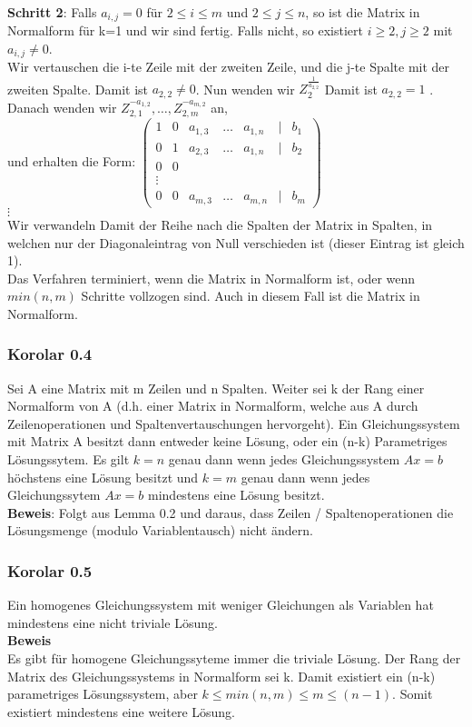 \documentclass{scrartcl}
\begin{document}
\)\\
\textbf{Schritt 2}: Falls \(a_{i,j} = 0\) f\"ur \(2 \le i \le m\) und \(2 \le j \le n\), so ist die Matrix in Normalform f\"ur k=1 und wir sind fertig. Falls nicht, so existiert \(i \ge 2, j\ge 2\) mit \(a_{i,j} \neq 0\).\\
Wir vertauschen die i-te Zeile mit der zweiten Zeile, und die j-te Spalte mit der zweiten Spalte. Damit ist \(a_{2,2} \neq 0\). Nun wenden wir \(Z_{2}^{\frac{1}{a_{2,2}}}\) Damit ist \(a_{2,2} = 1\) . Danach wenden wir \(Z_{2,1}^{-a_{1,2}}, \dots, Z_{2,m}^{-a_{m,2}}\) an,\\ und erhalten die Form:
\(
\begin{pmatrix}
1 & 0 & a_{1, 3} & \dots & a_{1, n} &|& b_1\\
0 & 1 & a_{2, 3} & \dots & a_{1, n} &|& b_2\\
0 & 0\\
\vdots\\
0 & 0 & a_{m, 3} & \dots & a_{m, n} &|& b_m
\end{pmatrix}
\)\\
\(\vdots\)\\
Wir verwandeln Damit der Reihe nach die Spalten der Matrix in Spalten, in welchen nur der Diagonaleintrag von Null verschieden ist (dieser Eintrag ist gleich 1).\\
Das Verfahren terminiert, wenn die Matrix in Normalform ist, oder wenn \(min(n, m)\) Schritte vollzogen sind. Auch in diesem Fall ist die Matrix in Normalform.

\subsubsection{Korolar 0.4}
Sei A eine Matrix  mit m Zeilen und n Spalten. Weiter sei k der Rang einer Normalform von A (d.h. einer Matrix in Normalform, welche aus A durch Zeilenoperationen und Spaltenvertauschungen hervorgeht). Ein Gleichungssystem  mit Matrix A besitzt dann entweder keine L\"osung, oder ein (n-k) Parametriges L\"osungssytem. Es gilt \(k=n\) genau dann wenn jedes Gleichungssystem \(Ax=b\) h\"ochstens eine L\"osung besitzt und \(k=m\) genau dann wenn jedes Gleichungssytem \(Ax=b\) mindestens eine L\"osung besitzt.\\
\textbf{Beweis}: Folgt aus Lemma 0.2 und daraus, dass Zeilen / Spaltenoperationen die L\"osungsmenge (modulo Variablentausch) nicht \"andern.

\subsubsection{Korolar 0.5}
Ein homogenes Gleichungssystem mit weniger Gleichungen als Variablen hat mindestens eine nicht triviale L\"osung.\\
\textbf{Beweis}\\
Es gibt f\"ur homogene Gleichungssyteme immer die triviale L\"osung. Der Rang der Matrix des Gleichungssystems in Normalform sei k. Damit existiert ein (n-k) parametriges L\"osungssystem, aber \(k \le min(n, m) \le m \le (n-1)\). Somit existiert mindestens eine weitere L\"osung.\\
\end{document}
